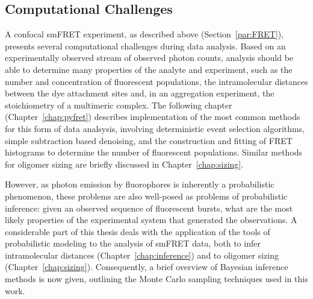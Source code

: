 \subsection{Computational Challenges}
A confocal smFRET experiment, as described above (Section~\ref{par:FRET}), presents several computational challenges during data analysis. Based on an experimentally observed stream of observed photon counts, analysis should be able to determine many properties of the analyte and experiment, such as the number and concentration of fluorescent populations, the intramolecular distances between the dye attachment sites and, in an aggregation experiment, the stoichiometry of a multimeric complex. The following chapter (Chapter~\ref{chap:pyfret}) describes implementation of the most common methods for this form of data analsysis, involving deterministic event selection algorithms, simple subtraction based denoising, and the construction and fitting of FRET histograms to determine the number of fluorescent populations. Similar methods for oligomer sizing are briefly discussed in Chapter~\ref{chap:sizing}. 

However, as photon emission by fluorophores is inherently a probabilistic phenomenon, these problems are also well-posed as problems of probabilistic inference: given an observed sequence of fluorescent bursts, what are the most likely properties of the experimental system that generated the observations. A considerable part of this thesis deals with the application of the tools of probabilistic modeling to the analysis of smFRET data, both to infer intramolecular distances (Chapter~\ref{chap:inference}) and to oligomer sizing (Chapter~\ref{chap:sizing}). Consequently, a brief overview of Bayesian inference methods  is now given, outlining the Monte Carlo sampling techniques used in this work.  



